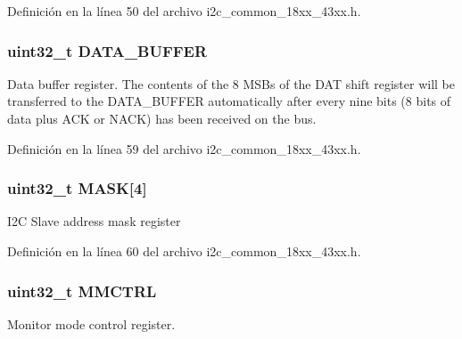 Definición en la línea 50 del archivo i2c\+\_\+common\+\_\+18xx\+\_\+43xx.\+h.

\subsubsection[{\texorpdfstring{D\+A\+T\+A\+\_\+\+B\+U\+F\+F\+ER}{DATA_BUFFER}}]{ uint32\+\_\+t D\+A\+T\+A\+\_\+\+B\+U\+F\+F\+ER}\hypertarget{struct_l_p_c___i2_c___t_ad18c5b32acbd5ecf72346ba4ca775b6f}{}\label{struct_l_p_c___i2_c___t_ad18c5b32acbd5ecf72346ba4ca775b6f}
Data buffer register. The contents of the 8 M\+S\+Bs of the D\+AT shift register will be transferred to the D\+A\+T\+A\+\_\+\+B\+U\+F\+F\+ER automatically after every nine bits (8 bits of data plus A\+CK or N\+A\+CK) has been received on the bus. 

Definición en la línea 59 del archivo i2c\+\_\+common\+\_\+18xx\+\_\+43xx.\+h.

\subsubsection[{\texorpdfstring{M\+A\+SK}{MASK}}]{ uint32\+\_\+t M\+A\+SK\mbox{[}4\mbox{]}}\hypertarget{struct_l_p_c___i2_c___t_a1f3bff85f542af4618c6016817bb7b52}{}\label{struct_l_p_c___i2_c___t_a1f3bff85f542af4618c6016817bb7b52}
I2C Slave address mask register 

Definición en la línea 60 del archivo i2c\+\_\+common\+\_\+18xx\+\_\+43xx.\+h.

\subsubsection[{\texorpdfstring{M\+M\+C\+T\+RL}{MMCTRL}}]{ uint32\+\_\+t M\+M\+C\+T\+RL}\hypertarget{struct_l_p_c___i2_c___t_a7b8c95de23b4a42be73bcfe8f434b61e}{}\label{struct_l_p_c___i2_c___t_a7b8c95de23b4a42be73bcfe8f434b61e}
Monitor mode control register. 

